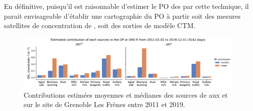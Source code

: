 En définitive, puisqu'il est raisonnable d'estimer le PO des \PMdix{} par cette technique,
il parait envisageable d'établir une cartographie du PO à partir soit des mesures satellites
de concentration de \PMdix, soit des sorties de modèle CTM.

\begin{figure}[ht]
    \centering
    \includegraphics[width=1.0\linewidth]{figures/chapter05/OPGRE-fr_source_estimated.pdf}
    \caption{Contributions estimées moyennes et médianes des sources de \PMdix{} aux
        \PODTTv{} et \POAAv{} sur le site de Grenoble Les Frènes entre 2011 et 2019.}%
    \label{fig:OPGRE-fr_source_estimated}
\end{figure}

